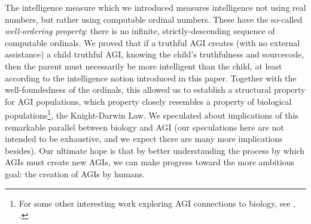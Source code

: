 \documentclass[runningheads]{llncs}
\begin{document}
The intelligence measure which we introduced measures intelligence not using real
numbers, but rather using computable ordinal numbers. These have the so-called
\emph{well-ordering property}: there is no infinite, strictly-descending sequence
of computable ordinals. We proved that if a truthful AGI creates (with no external
assistance) a child truthful AGI, knowing the child's truthfulness and sourcecode,
then the parent must necessarily be more intelligent than the child, at least according
to the intelligence notion introduced in this paper. Together with the well-foundedness
of the ordinals, this allowed us to establish a structural property for AGI populations,
which property closely resembles a property of biological populations\footnote{For
some other interesting work exploring AGI connections to biology,
see \cite{strannegaard2018learning}, \cite{yoshida2017homeostatic}.}, the Knight-Darwin
Law. We speculated about implications of this remarkable parallel between biology and
AGI (our speculations here are not intended to be exhaustive, and we expect there
are many more implications besides). Our ultimate hope is that by better understanding
the process by which AGIs must create new AGIs, we can make progress toward the more
ambitious goal: the creation of AGIs by humans.




\end{document}
